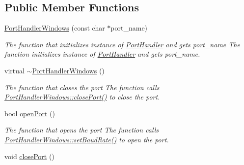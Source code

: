 \subsection*{Public Member Functions}
\begin{DoxyCompactItemize}
\item 
\hyperlink{classmercury_1_1_port_handler_windows_aa7849c96f4541fd6d1c139b33902fe24}{Port\+Handler\+Windows} (const char $\ast$port\+\_\+name)\hypertarget{classmercury_1_1_port_handler_windows_aa7849c96f4541fd6d1c139b33902fe24}{}\label{classmercury_1_1_port_handler_windows_aa7849c96f4541fd6d1c139b33902fe24}

\begin{DoxyCompactList}\small\item\em The function that initializes instance of \hyperlink{classmercury_1_1_port_handler}{Port\+Handler} and gets port\+\_\+name  The function initializes instance of \hyperlink{classmercury_1_1_port_handler}{Port\+Handler} and gets port\+\_\+name. \end{DoxyCompactList}\item 
virtual \hyperlink{classmercury_1_1_port_handler_windows_a15b9eb8961f1c19471ccf28b50e44e17}{$\sim$\+Port\+Handler\+Windows} ()\hypertarget{classmercury_1_1_port_handler_windows_a15b9eb8961f1c19471ccf28b50e44e17}{}\label{classmercury_1_1_port_handler_windows_a15b9eb8961f1c19471ccf28b50e44e17}

\begin{DoxyCompactList}\small\item\em The function that closes the port  The function calls \hyperlink{classmercury_1_1_port_handler_windows_a75263b8ac698a2ae302fc68265523463}{Port\+Handler\+Windows\+::close\+Port()} to close the port. \end{DoxyCompactList}\item 
bool \hyperlink{classmercury_1_1_port_handler_windows_adfe63f740bfc82abc6ba720a2c87116b}{open\+Port} ()
\begin{DoxyCompactList}\small\item\em The function that opens the port  The function calls \hyperlink{classmercury_1_1_port_handler_windows_a31dedf26ac2e57cc3cd39f8a3372d2da}{Port\+Handler\+Windows\+::set\+Baud\+Rate()} to open the port. \end{DoxyCompactList}\item 
void \hyperlink{classmercury_1_1_port_handler_windows_a75263b8ac698a2ae302fc68265523463}{close\+Port} ()\hypertarget{classmercury_1_1_port_handler_windows_a75263b8ac698a2ae302fc68265523463}{}\label{classmercury_1_1_port_handler_windows_a75263b8ac698a2ae302fc68265523463}


\end{DoxyCompactItemize}
